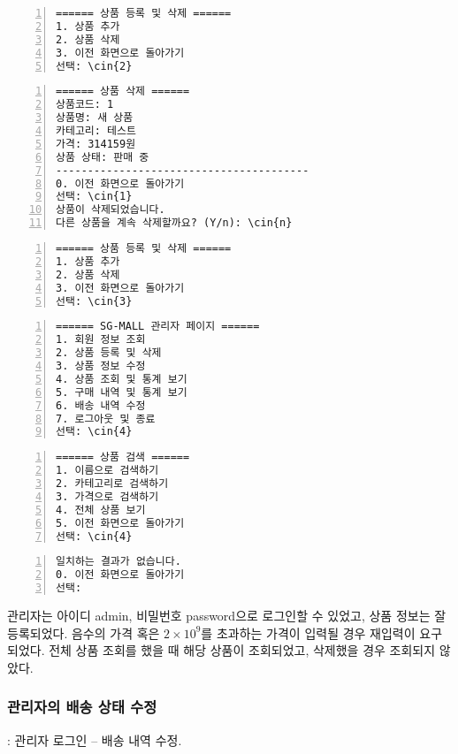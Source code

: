 \documentclass[runningheads]{llncs}
\newcommand{\cin}[1]{\textbf{\textcolor{orange}{#1}}}
\begin{document}
\begin{Verbatim}[frame=single,numbers=left,commandchars=\\\{\}]
====== 상품 등록 및 삭제 ======
1. 상품 추가
2. 상품 삭제
3. 이전 화면으로 돌아가기
선택: \cin{2}
\end{Verbatim}

\begin{Verbatim}[frame=single,numbers=left,commandchars=\\\{\}]
====== 상품 삭제 ======
상품코드: 1
상품명: 새 상품
카테고리: 테스트
가격: 314159원
상품 상태: 판매 중
----------------------------------------
0. 이전 화면으로 돌아가기
선택: \cin{1}
상품이 삭제되었습니다.
다른 상품을 계속 삭제할까요? (Y/n): \cin{n}
\end{Verbatim}

\begin{Verbatim}[frame=single,numbers=left,commandchars=\\\{\}]
====== 상품 등록 및 삭제 ======
1. 상품 추가
2. 상품 삭제
3. 이전 화면으로 돌아가기
선택: \cin{3}
\end{Verbatim}

\begin{Verbatim}[frame=single,numbers=left,commandchars=\\\{\}]
====== SG-MALL 관리자 페이지 ======
1. 회원 정보 조회
2. 상품 등록 및 삭제
3. 상품 정보 수정
4. 상품 조회 및 통계 보기
5. 구매 내역 및 통계 보기
6. 배송 내역 수정
7. 로그아웃 및 종료
선택: \cin{4}
\end{Verbatim}

\begin{Verbatim}[frame=single,numbers=left,commandchars=\\\{\}]
====== 상품 검색 ======
1. 이름으로 검색하기
2. 카테고리로 검색하기
3. 가격으로 검색하기
4. 전체 상품 보기
5. 이전 화면으로 돌아가기
선택: \cin{4}
\end{Verbatim}

\begin{Verbatim}[frame=single,numbers=left,commandchars=\\\{\}]
일치하는 결과가 없습니다.
0. 이전 화면으로 돌아가기
선택: 
\end{Verbatim}

관리자는 아이디 admin, 비밀번호 password으로 로그인할 수 있었고, 상품 정보는 잘 등록되었다. 음수의 가격 혹은 $2\times {10}^{9}$를 초과하는 가격이 입력될 경우 재입력이 요구되었다. 전체 상품 조회를 했을 때 해당 상품이 조회되었고, 삭제했을 경우 조회되지 않았다.

\subsubsection{관리자의 배송 상태 수정}: 관리자 로그인 -- 배송 내역 수정.
\end{document}
